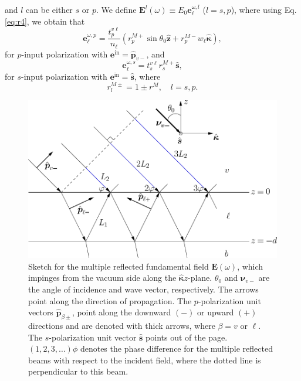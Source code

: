 and $l$ can be either $s$ or $p$. We define $\mathbf{E}^{l}(\omega)\equiv
E_{0}\mathbf{e}^{\omega,l}_\ell$ ($l=s,p$), where using Eq. \eqref{eq:r4}, we
obtain that
\begin{equation}\label{eq:mcvep}
\mathbf{e}^{\omega,p}_{\ell}=\frac{t^{v\ell}_{p}}{n_{\ell}}
\left( 
  r^{M+}_{p}\sin\theta_{0}\hat{\mathbf{z}}
+ r^{M-}_{p}w_{\ell}\hat{\boldsymbol{\kappa}}
\right),
\end{equation} 
for $p$-input polarization with
$\mathbf{e}^{\mathrm{in}}=\hat{\mathbf{p}}_{v-}$, and
\begin{equation}\label{mcves}
\mathbf{e}^{\omega,s}_\ell=t^{v\ell}_{s}r^{M+}_{s}\hat{\mathbf{s}},
\end{equation}
for $s$-input polarization with $\mathbf{e}^{\mathrm{in}}=\hat{\mathbf{s}}$,
where
\begin{equation}\label{mvc}
r^{M\pm}_{l}=1\pm r^{M},\quad l = s,p.
\end{equation}

\begin{figure}
\centering 
\includegraphics[scale=.5]{content/figures/diag-3layer_MR_1w}
\caption{Sketch for the multiple reflected fundamental field
$\mathbf{E}(\omega)$, which impinges from the vacuum side along the
$\hat{\boldsymbol{\kappa}}z$-plane. $\theta_{0}$ and $\boldsymbol{\nu}_{v-}$ are
the angle of incidence and wave vector, respectively. The arrows point along the
direction of propagation. The $p$-polarization unit vectors
$\hat{\mathbf{p}}_{\beta\pm}$, point along the downward $(-)$ or upward $(+)$
directions and are denoted with thick arrows, where $\beta = v$ or $\ell$. The
$s$-polarization unit vector $\hat{\mathbf{s}}$ points out of the page.
$(1,2,3,\ldots)\phi$ denotes the phase difference for the multiple reflected
beams with respect to the incident field, where the dotted line is perpendicular
to this beam.}
\label{fig:MR3layer1w}
\end{figure}


